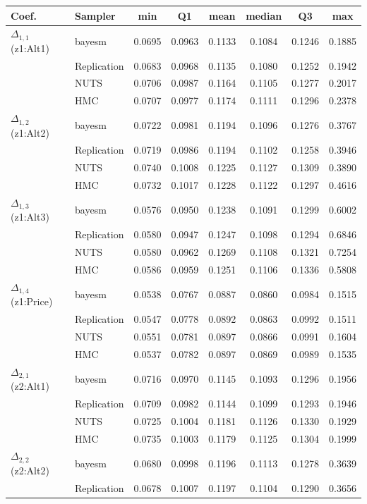 \begin{tabular}{llcccccc}
\toprule
Coef. & Sampler & min & Q1 & mean & median & Q3 & max \\
\midrule
$\Delta_{1,1}$ (z1:Alt1) & bayesm & 0.0695 & 0.0963 & 0.1133 & 0.1084 & 0.1246 & 0.1885 \\
 & Replication & 0.0683 & 0.0968 & 0.1135 & 0.1080 & 0.1252 & 0.1942 \\
 & NUTS & 0.0706 & 0.0987 & 0.1164 & 0.1105 & 0.1277 & 0.2017 \\
 & HMC & 0.0707 & 0.0977 & 0.1174 & 0.1111 & 0.1296 & 0.2378 \\
$\Delta_{1,2}$ (z1:Alt2) & bayesm & 0.0722 & 0.0981 & 0.1194 & 0.1096 & 0.1276 & 0.3767 \\
 & Replication & 0.0719 & 0.0986 & 0.1194 & 0.1102 & 0.1258 & 0.3946 \\
 & NUTS & 0.0740 & 0.1008 & 0.1225 & 0.1127 & 0.1309 & 0.3890 \\
 & HMC & 0.0732 & 0.1017 & 0.1228 & 0.1122 & 0.1297 & 0.4616 \\
$\Delta_{1,3}$ (z1:Alt3) & bayesm & 0.0576 & 0.0950 & 0.1238 & 0.1091 & 0.1299 & 0.6002 \\
 & Replication & 0.0580 & 0.0947 & 0.1247 & 0.1098 & 0.1294 & 0.6846 \\
 & NUTS & 0.0580 & 0.0962 & 0.1269 & 0.1108 & 0.1321 & 0.7254 \\
 & HMC & 0.0586 & 0.0959 & 0.1251 & 0.1106 & 0.1336 & 0.5808 \\
$\Delta_{1,4}$ (z1:Price) & bayesm & 0.0538 & 0.0767 & 0.0887 & 0.0860 & 0.0984 & 0.1515 \\
 & Replication & 0.0547 & 0.0778 & 0.0892 & 0.0863 & 0.0992 & 0.1511 \\
 & NUTS & 0.0551 & 0.0781 & 0.0897 & 0.0866 & 0.0991 & 0.1604 \\
 & HMC & 0.0537 & 0.0782 & 0.0897 & 0.0869 & 0.0989 & 0.1535 \\
$\Delta_{2,1}$ (z2:Alt1) & bayesm & 0.0716 & 0.0970 & 0.1145 & 0.1093 & 0.1296 & 0.1956 \\
 & Replication & 0.0709 & 0.0982 & 0.1144 & 0.1099 & 0.1293 & 0.1946 \\
 & NUTS & 0.0725 & 0.1004 & 0.1181 & 0.1126 & 0.1330 & 0.1929 \\
 & HMC & 0.0735 & 0.1003 & 0.1179 & 0.1125 & 0.1304 & 0.1999 \\
$\Delta_{2,2}$ (z2:Alt2) & bayesm & 0.0680 & 0.0998 & 0.1196 & 0.1113 & 0.1278 & 0.3639 \\
 & Replication & 0.0678 & 0.1007 & 0.1197 & 0.1104 & 0.1290 & 0.3656 \\

\end{tabular}
